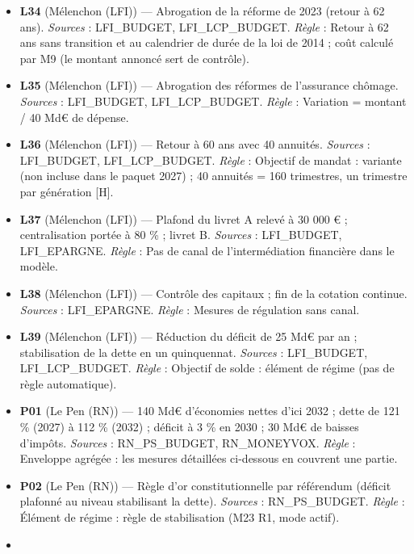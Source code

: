 \documentclass[
  11pt,
  11pt,
  a4paper,
  openany]{book}
\begin{document}
\begin{itemize}
  le solde public). {[}H{]} Montée en charge non précisée : appliqué dès
  2028 ; additionnalité totale (borne haute). Financement, dette du pôle
  public et effet d'offre non représentés.
\item
  \textbf{L34} (Mélenchon (LFI)) --- Abrogation de la réforme de 2023
  (retour à 62 ans). \emph{Sources} : LFI\_BUDGET, LFI\_LCP\_BUDGET.
  \emph{Règle} : Retour à 62 ans sans transition et au calendrier de
  durée de la loi de 2014 ; coût calculé par M9 (le montant annoncé sert
  de contrôle).
\item
  \textbf{L35} (Mélenchon (LFI)) --- Abrogation des réformes de
  l'assurance chômage. \emph{Sources} : LFI\_BUDGET, LFI\_LCP\_BUDGET.
  \emph{Règle} : Variation = montant / 40 Md€ de dépense.
\item
  \textbf{L36} (Mélenchon (LFI)) --- Retour à 60 ans avec 40 annuités.
  \emph{Sources} : LFI\_BUDGET, LFI\_LCP\_BUDGET. \emph{Règle} :
  Objectif de mandat : variante (non incluse dans le paquet 2027) ; 40
  annuités = 160 trimestres, un trimestre par génération {[}H{]}.
\item
  \textbf{L37} (Mélenchon (LFI)) --- Plafond du livret A relevé à 30 000
  € ; centralisation portée à 80 \% ; livret B. \emph{Sources} :
  LFI\_BUDGET, LFI\_EPARGNE. \emph{Règle} : Pas de canal de
  l'intermédiation financière dans le modèle.
\item
  \textbf{L38} (Mélenchon (LFI)) --- Contrôle des capitaux ; fin de la
  cotation continue. \emph{Sources} : LFI\_EPARGNE. \emph{Règle} :
  Mesures de régulation sans canal.
\item
  \textbf{L39} (Mélenchon (LFI)) --- Réduction du déficit de 25 Md€ par
  an ; stabilisation de la dette en un quinquennat. \emph{Sources} :
  LFI\_BUDGET, LFI\_LCP\_BUDGET. \emph{Règle} : Objectif de solde :
  élément de régime (pas de règle automatique).
\item
  \textbf{P01} (Le Pen (RN)) --- 140 Md€ d'économies nettes d'ici 2032 ;
  dette de 121 \% (2027) à 112 \% (2032) ; déficit à 3 \% en 2030 ; 30
  Md€ de baisses d'impôts. \emph{Sources} : RN\_PS\_BUDGET,
  RN\_MONEYVOX. \emph{Règle} : Enveloppe agrégée : les mesures
  détaillées ci-dessous en couvrent une partie.
\item
  \textbf{P02} (Le Pen (RN)) --- Règle d'or constitutionnelle par
  référendum (déficit plafonné au niveau stabilisant la dette).
  \emph{Sources} : RN\_PS\_BUDGET. \emph{Règle} : Élément de régime :
  règle de stabilisation (M23 R1, mode actif).
\item

\end{itemize}
\end{document}
